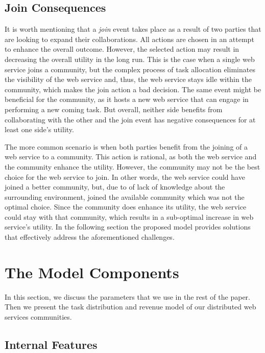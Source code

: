 \subsection{Join Consequences}\label{s:jc}
It is worth mentioning that a \emph{join} event takes place as a result of two parties that are looking to expand their collaborations. All actions are chosen in an attempt to enhance the overall outcome. However, the selected action may result in decreasing the overall utility in the long run.
This is the case when a single web service joins a community, but the complex process of task allocation eliminates the visibility of the web service and, thus, the web service stays idle within the community, which makes the join action a bad decision. The same event might be beneficial for the community, as it hosts a new web service that can engage in performing a new coming task. But overall, neither side benefits from collaborating with the other and the join event has negative consequences for at least one side's utility.

The more common scenario is when both parties benefit from the joining of a web service to a community. This action is rational, as both the web service and the community enhance the utility. However, the community may not be the best choice for the web service to join. In other words, the web service could have joined a better community, but, due to of lack of knowledge about the surrounding environment, joined the available community which was not the optimal choice. Since the community does enhance its utility, the web service could stay with that community, which results in a sub-optimal increase in web service's utility. In the following section the proposed model provides solutions that effectively address the aforementioned challenges.

\section{The Model Components}\label{s:themodelcomponents}

In this section, we discuss the parameters that we use in the rest of the paper. Then we present the task distribution and revenue model of our distributed web services communities.

\subsection{Internal Features}\label{s:if}

